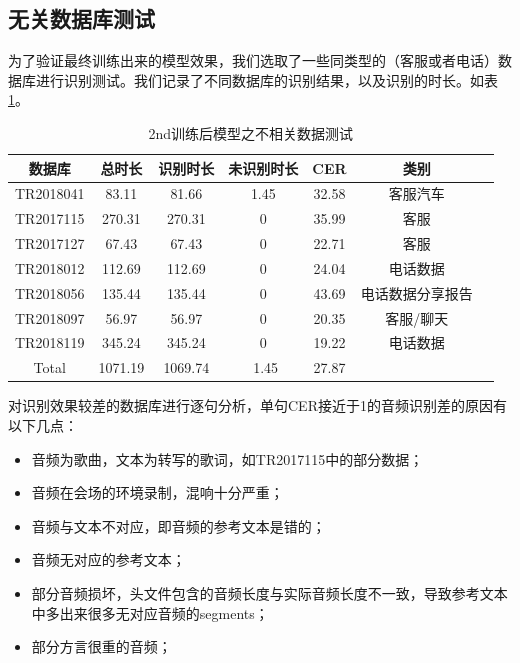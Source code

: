 \subsection{无关数据库测试}
为了验证最终训练出来的模型效果，我们选取了一些同类型的（客服或者电话）数据库进行识别测试。我们记录了不同数据库的识别结果，以及识别的时长。如表\ref{tab:other-corpus}。
\begin{table}[h]
 \centering
 \caption{2nd训练后模型之不相关数据测试}
	 \begin{tabular*}{1\textwidth}{@{\extracolsep{\fill}}ccccccc}
	 \toprule
		{\bf 数据库   } & {\bf 总时长   } & {\bf 识别时长   } & {\bf 未识别时长    } & {\bf CER    } & {\bf 类别    } \\
	 \midrule
		TR2018041 &     83.11  &    81.66  &     1.45&       32.58&       客服\/汽车 & \\
		TR2017115 &     270.31 &    270.31 &     0   &       35.99&       客服       & \\
		TR2017127 &     67.43  &    67.43  &     0   &       22.71&       客服       & \\
		TR2018012 &     112.69 &    112.69 &     0   &       24.04&       电话数据    & \\
		TR2018056 &     135.44 &    135.44 &     0   &       43.69&       电话数据\/分享报告& \\
		TR2018097 &     56.97  &    56.97  &     0   &       20.35&       客服/聊天   & \\
		TR2018119 &     345.24 &    345.24 &     0   &       19.22&       电话数据    & \\
		Total     &     1071.19&    ‬1069.74&‬     1.45&       27.87&      			 & \\
	 \bottomrule
	 \end{tabular*}%
 \label{tab:other-corpus}%
\end{table}%

对识别效果较差的数据库进行逐句分析，单句CER接近于1的音频识别差的原因有以下几点：
\begin{itemize}
	\item 音频为歌曲，文本为转写的歌词，如TR2017115中的部分数据；
	\item 音频在会场的环境录制，混响十分严重；
	\item 音频与文本不对应，即音频的参考文本是错的；
	\item 音频无对应的参考文本；
	\item 部分音频损坏，头文件包含的音频长度与实际音频长度不一致，导致参考文本中多出来很多无对应音频的segments；
	\item 部分方言很重的音频；
\end{itemize}

